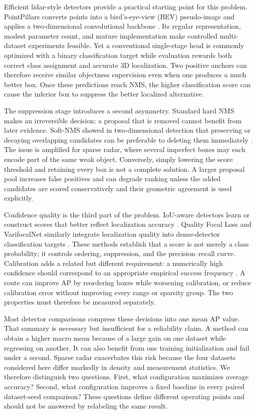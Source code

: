 \documentclass[preprint,12pt,times]{elsarticle}
\begin{document}
Efficient lidar-style detectors provide a practical starting point for this
problem. PointPillars converts points into a bird's-eye-view (BEV) pseudo-image
and applies a two-dimensional convolutional backbone
\cite{lang2019pointpillars}. Its regular representation, modest parameter
count, and mature implementation make controlled multi-dataset experiments
feasible. Yet a conventional single-stage head is commonly optimized with a
binary classification target while evaluation rewards both correct class
assignment and accurate 3D localization. Two positive anchors can therefore
receive similar objectness supervision even when one produces a much better
box. Once these predictions reach NMS, the higher classification score can
cause the inferior box to suppress the better localized alternative.

The suppression stage introduces a second asymmetry. Standard hard NMS makes
an irreversible decision: a proposal that is removed cannot benefit from
later evidence. Soft-NMS showed in two-dimensional detection that preserving
or decaying overlapping candidates can be preferable to deleting them
immediately \cite{bodla2017softnms}. The issue is amplified for sparse radar,
where several imperfect boxes may each encode part of the same weak object.
Conversely, simply lowering the score threshold and retaining every box is not
a complete solution. A larger proposal pool increases false positives and can
degrade ranking unless the added candidates are scored conservatively and
their geometric agreement is used explicitly.

Confidence quality is the third part of the problem. IoU-aware detectors learn
or construct scores that better reflect localization accuracy
\cite{jiang2018iounet}. Quality Focal Loss and VarifocalNet similarly integrate
localization quality into dense-detector classification targets
\cite{li2022gfl,zhang2021varifocalnet}. These methods establish that a score is
not merely a class probability; it controls ordering, suppression, and the
precision--recall curve. Calibration adds a related but different requirement:
a numerically high confidence should correspond to an appropriate empirical
success frequency \cite{guo2017calibration}. A route can improve AP by
reordering boxes while worsening calibration, or reduce calibration error
without improving every range or sparsity group. The two properties must
therefore be measured separately.

Most detector comparisons compress these decisions into one mean AP value.
That summary is necessary but insufficient for a reliability claim. A method
can obtain a higher macro mean because of a large gain on one dataset while
regressing on another. It can also benefit from one training initialization
and fail under a second. Sparse radar exacerbates this risk because the four
datasets considered here differ markedly in density and measurement
statistics. We therefore distinguish two questions. First, what configuration
maximizes average accuracy? Second, what configuration improves a fixed
baseline in every paired dataset-seed comparison? These questions define
different operating points and should not be answered by relabeling the same
result.
\end{document}
